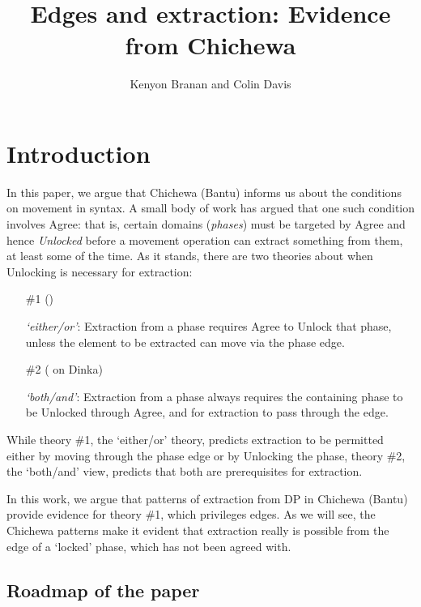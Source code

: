 \documentclass[output=paper,colorlinks,citecolor=brown]{langscibook}
\title{Edges and extraction: Evidence from Chichewa}
\author{Kenyon Branan\affiliation{MIT} and Colin Davis\affiliation{MIT}}
\begin{document}
\maketitle 

\section{Introduction}\label{sec:branan:1}

In this paper, we argue that Chichewa (Bantu) informs us about the conditions on movement in syntax. A small body of work has argued that one such condition involves Agree: that is, certain domains (\textit{phases}) must be targeted by Agree and hence \textit{Unlocked} before a movement operation can extract something from them, at least some of the time. As it stands, there are two theories about when Unlocking is necessary for extraction:

\begin{itemize}
	\item[\#1] (\citealt{RackowskiRichards2005, Halpert2016, Halpert2019, Branan2018})

    \textit{`either/or'}: Extraction from a phase requires Agree to Unlock that phase, unless the element to be extracted can move via the phase edge.

    \item[\#2] (\citealt{VanUrkRichards2015} on Dinka)

    \textit{`both/and'}: Extraction from a phase always requires the containing phase to be Unlocked through Agree, and for extraction to pass through the edge.
\end{itemize}

While theory \#1, the `either/or' theory, predicts extraction to be permitted either by moving through the phase edge or by Unlocking the phase, theory \#2, the `both/and' view, predicts that both are prerequisites for extraction.

In this work, we argue that patterns of extraction from DP in Chichewa (Bantu) provide evidence for theory \#1, which privileges edges. As we will see, the Chichewa patterns make it evident that extraction really is possible from the edge of a `locked' phase, which has not been agreed with.

\subsection{Roadmap of the paper}\label{sec:branan:1.1}
\end{document}
